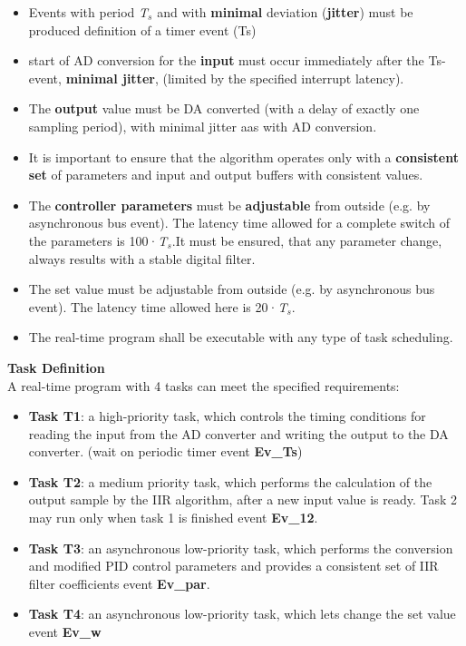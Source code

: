 \begin{itemize}
\item  Events with period \textit{T${}_{s}$} and with \textbf{minimal} deviation (\textbf{jitter}) must be produced  definition of a timer event (Ts)

\item  start of AD conversion for the \textbf{input} must occur immediately after the Ts-event,  \textbf{minimal jitter}, (limited by the specified interrupt latency).

\item  The \textbf{output} value must be DA converted (with a delay of exactly one sampling period), with minimal jitter aas with AD conversion. 

\item  It is important to ensure that the algorithm operates only with a \textbf{consistent set} of parameters and input and output buffers with consistent values. 

\item  The \textbf{controller parameters} must be \textbf{adjustable} from outside (e.g. by asynchronous bus event). The latency time allowed for a complete switch of the parameters is 100·\textit{T${}_{s}$}.It must be ensured, that any parameter change, always results with a stable digital filter. 

\item  The set value must be adjustable from outside (e.g. by asynchronous bus event). The latency time allowed here is 20·\textit{T${}_{s}$}.

\item  The real-time program shall be executable with any type of task scheduling. 
\end{itemize}

\textbf{Task Definition}\\

A real-time program with 4 tasks can meet the specified requirements:

\begin{itemize}
\item  \textbf{Task T1}: a high-priority task, which controls the timing conditions for reading the input from the AD converter and writing the output to the DA converter. (wait on periodic timer event \textbf{Ev\_Ts})

\item  \textbf{Task T2}: a medium priority task, which performs the calculation of the output sample by the IIR algorithm, after a new input value is ready. Task 2 may run only when task 1 is finished  event \textbf{Ev\_12}.

\item  \textbf{Task T3}: an asynchronous low-priority task, which performs the conversion and modified PID control parameters and provides a consistent set of IIR filter coefficients  event \textbf{Ev\_par}.

\item  \textbf{Task T4}: an asynchronous low-priority task, which lets change the set value event \textbf{Ev\_w}
\end{itemize}


